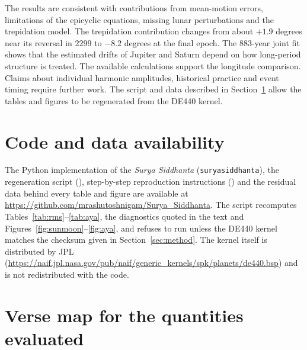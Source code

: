 \documentclass[11pt,a4paper]{article}
\newcommand{\SuSi}{\textit{Surya Siddhanta}}
\newcommand{\file}[1]{\texttt{#1}}
\begin{document}
The results are consistent with contributions from mean-motion errors, limitations of the epicyclic equations, missing lunar perturbations and the trepidation model. The trepidation contribution changes from about $+1.9$ degrees near its reversal in 2299 to $-8.2$ degrees at the final epoch. The 883-year joint fit shows that the estimated drifts of Jupiter and Saturn depend on how long-period structure is treated. The available calculations support the longitude comparison. Claims about individual harmonic amplitudes, historical practice and event timing require further work. The script and data described in Section~\ref{sec:availability} allow the tables and figures to be regenerated from the DE440 kernel.

\section{Code and data availability}
\label{sec:availability}

\begin{sloppypar}
The Python implementation of the \SuSi{} (\file{suryasiddhanta}), the regeneration script (), step-by-step reproduction instructions () and the residual data behind every table and figure are available at \url{https://github.com/mrashutoshnigam/Surya_Siddhanta}. The script recomputes Tables~\ref{tab:rms}--\ref{tab:aya}, the diagnostics quoted in the text and Figures~\ref{fig:sunmoon}--\ref{fig:aya}, and refuses to run unless the DE440 kernel matches the checksum given in Section~\ref{sec:method}. The kernel itself is distributed by JPL (\url{https://naif.jpl.nasa.gov/pub/naif/generic_kernels/spk/planets/de440.bsp}) and is not redistributed with the code.
\end{sloppypar}

\nocite{stephenson2016}



\appendix

\section{Verse map for the quantities evaluated}
\label{app:verses}
\end{document}
